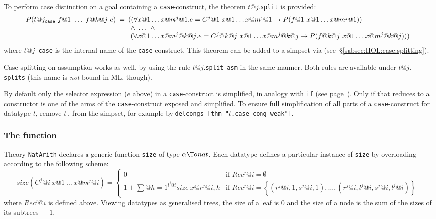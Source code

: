 To perform case distinction on a goal containing a \texttt{case}-construct,
the theorem $t@j.$\texttt{split} is provided:
\[
\begin{array}{@{}rcl@{}}
P(t@j_\mathtt{case}~f@1~\dots~f@{k@j}~e) &\!\!\!=&
\!\!\! ((\forall x@1 \dots x@{m^j@1}. e = C^j@1~x@1\dots x@{m^j@1} \to
                             P(f@1~x@1\dots x@{m^j@1})) \\
&&\!\!\! ~\land~ \dots ~\land \\
&&~\!\!\! (\forall x@1 \dots x@{m^j@{k@j}}. e = C^j@{k@j}~x@1\dots x@{m^j@{k@j}} \to
                             P(f@{k@j}~x@1\dots x@{m^j@{k@j}})))
\end{array}
\]
where $t@j$\texttt{_case} is the internal name of the \texttt{case}-construct.
This theorem can be added to a simpset via 
(see~{\S}\ref{subsec:HOL:case:splitting}).

Case splitting on assumption works as well, by using the rule
$t@j.$\texttt{split_asm} in the same manner.  Both rules are available under
$t@j.$\texttt{splits} (this name is \emph{not} bound in ML, though).

\begin{warn}%
  By default only the selector expression ($e$ above) in a
  \texttt{case}-construct is simplified, in analogy with \texttt{if} (see
  page~\pageref{if-simp}). Only if that reduces to a constructor is one of
  the arms of the \texttt{case}-construct exposed and simplified. To ensure
  full simplification of all parts of a \texttt{case}-construct for datatype
  $t$, remove $t$\texttt{.} from the simpset, for
  example by \texttt{delcongs [thm "$t$.case_cong_weak"]}.
\end{warn}

\subsubsection{The function }\label{sec:HOL:size}

Theory \texttt{NatArith} declares a generic function \texttt{size} of type
$\alpha\To nat$.  Each datatype defines a particular instance of \texttt{size}
by overloading according to the following scheme:
\[
size(C^j@i~x@1~\dots~x@{m^j@i}) = \!
\left\{
\begin{array}{ll}
0 & \!\mbox{if $Rec^j@i = \emptyset$} \\
1+\sum\limits@{h=1}^{l^j@i}size~x@{r^j@{i,h}} &
 \!\mbox{if $Rec^j@i = \left\{\left(r^j@{i,1},s^j@{i,1}\right),\ldots,
  \left(r^j@{i,l^j@i},s^j@{i,l^j@i}\right)\right\}$}
\end{array}
\right.
\]
where $Rec^j@i$ is defined above.  Viewing datatypes as generalised trees, the
size of a leaf is 0 and the size of a node is the sum of the sizes of its
subtrees ${}+1$.

